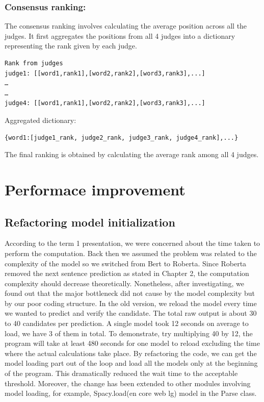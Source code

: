 \documentclass[12pt,oneside,openright,a4paper]{cpe-english-project}
\begin{document}
\subsubsection{ Consensus ranking:}

The consensus ranking involves calculating the average position across all the judges. It first aggregates the positions from all 4 judges into a dictionary representing the rank given by each judge. 
\begin{verbatim}
Rank from judges
judge1: [[word1,rank1],[word2,rank2],[word3,rank3],...]
…
…
judge4: [[word1,rank1],[word2,rank2],[word3,rank3],...]

\end{verbatim}
Aggregated dictionary: 
\begin{verbatim}
{word1:[judge1_rank, judge2_rank, judge3_rank, judge4_rank],...}
\end{verbatim}
The final ranking is obtained by calculating the average rank among all 4 judges.


\section{Performace improvement}
\subsection{Refactoring model initialization }
According to the term 1 presentation, we were concerned about the time taken to perform the computation. Back then we assumed the problem was related to the complexity of the model so we switched from Bert to Roberta. Since Roberta removed the next sentence prediction as stated in Chapter 2, the computation complexity should decrease theoretically. Nonetheless, after investigating, we found out that the major bottleneck did not cause by the model complexity but by our poor coding structure. In the old version, we reload the model every time we wanted to predict and verify the candidate. The total raw output is about 30 to 40 candidates per prediction. A single model took 12 seconds on average to load, we have 3 of them in total. To demonstrate, try multiplying 40 by 12, the program will take at least 480 seconds for one model to reload excluding the time where the actual calculations take place. By refactoring the code, we can get the model loading part out of the loop and load all the models only at the beginning of the program. This dramatically reduced the wait time to the acceptable threshold. Moreover, the change has been extended to other modules involving model loading, for example, Spacy.load(en core web lg) model in the Parse class.
\end{document}
